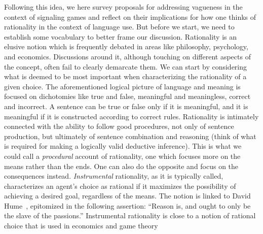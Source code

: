 \documentclass[a4paper]{article}
\begin{document}

Following this idea, we here survey proposals for addressing vagueness in the context of signaling games and reflect on their implications for how one thinks of rationality in the context of language use.
But before we start, we need to establish some vocabulary to better frame our discussion.
Rationality is an elusive notion which is frequently debated in areas like philosophy, psychology, and economics.
Discussions around it, although touching on different aspects of the concept, often fail to clearly demarcate them.
We can start by considering what is deemed to be most important when characterizing the rationality of a given choice.
The aforementioned logical picture of language and meaning is focused on dichotomies like true and false, meaningful and meaningless, correct and incorrect.
A sentence can be true or false only if it is meaningful, and it is meaningful if it is constructed according to correct rules.
Rationality is intimately connected with the ability to follow good procedures, not only of sentence production, but ultimately of sentence combination and reasoning (think of what is required for making a logically valid deductive inference).
This is what we could call a \emph{procedural} account of rationality, one which focuses more on the means rather than the ends.
One can also do the opposite and focus on the consequences instead.
\emph{Instrumental} rationality, as it is typically called, characterizes an agent's choice as rational if it maximizes the possibility of achieving a desired goal, regardless of the means.
The notion is linked to David Hume~\parencite*{hume_treatise_1738}, epitomized in the following assertion: ``Reason is, and ought to only be the slave of the passions.''
Instrumental rationality is close to a notion of rational choice that is used in economics and game theory%
\end{document}
